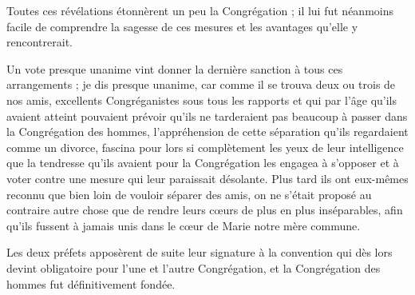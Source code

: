 Toutes ces révélations étonnèrent un peu la Congrégation ; il lui fut néanmoins facile de comprendre la sagesse de ces mesures et les avantages qu'elle y rencontrerait.

Un vote presque unanime vint donner la dernière sanction à tous ces arrangements ; je dis presque unanime, car comme il se trouva deux ou trois de nos amis, excellents Congréganistes sous tous les rapports et qui par l'âge qu'ils avaient atteint pouvaient prévoir qu'ils ne tarderaient pas beaucoup à passer dans la Congrégation des hommes, l'appréhension de cette séparation qu'ils regardaient comme un divorce, fascina pour lors si complètement les yeux de leur intelligence que la tendresse qu'ils avaient pour la Congrégation les engagea à s'opposer et à voter contre une mesure qui leur paraissait désolante. Plus tard ils ont eux-mêmes reconnu que bien loin de vouloir séparer des amis, on ne s'était proposé au contraire autre chose que de rendre leurs cœurs de plus en plus inséparables, afin qu'ils fussent à jamais unis dans le cœur de Marie notre mère commune.

Les deux préfets apposèrent de suite leur signature à la
convention qui dès lors devint obligatoire pour l'une et l'autre Congrégation, et la Congrégation des hommes fut définitivement fondée.
